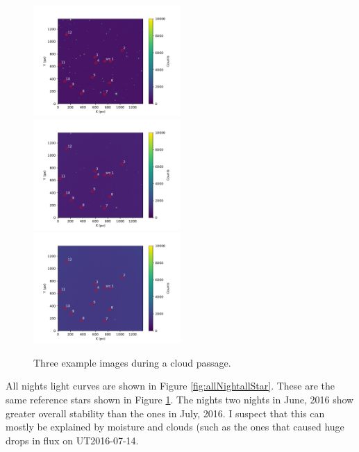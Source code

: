 \documentclass[twocolumn]{aastex61}
\begin{document}
\begin{figure}
\begin{centering}
\includegraphics[width=0.5\textwidth]{images/ut2016_07_14_clouds/figure_index_152.pdf}
\includegraphics[width=0.5\textwidth]{images/ut2016_07_14_clouds/figure_index_162.pdf}
\includegraphics[width=0.5\textwidth]{images/ut2016_07_14_clouds/figure_index_166.pdf}
\caption{Three example images during a cloud passage.}\label{fig:ut2016-07-14cloudImg}
\end{centering}
\end{figure}

All nights light curves are shown in Figure \ref{fig:allNightallStar}.
These are the same reference stars shown in Figure \ref{fig:ut2016-07-14cloudImg}.
The nights two nights in June, 2016 show greater overall stability than the ones in July, 2016.
I suspect that this can mostly be explained by moisture and clouds (such as the ones that caused huge drops in flux on UT2016-07-14.
\end{document}
